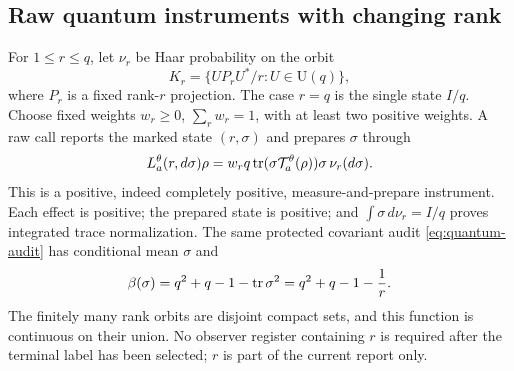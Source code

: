\subsection{Raw quantum instruments with changing rank}
For $1\le r\le q$, let $\nu_r$ be Haar probability on the orbit
\[
 K_r=\{UP_rU^*/r:U\in\mathrm U(q)\},
\]
where $P_r$ is a fixed rank-$r$ projection. The case $r=q$ is the single state $I/q$. Choose fixed weights $w_r\ge0$, $\sum_rw_r=1$, with at least two positive weights. A raw call reports the marked state $(r,\sigma)$ and prepares $\sigma$ through
\begin{equation}\label{eq:rank-instrument}
 L_a^\theta(r,d\sigma)\rho
       =w_rq\operatorname{tr}(\sigma\mathcal T_a^\theta(\rho))\sigma\,\nu_r(d\sigma).
\end{equation}
This is a positive, indeed completely positive, measure-and-prepare instrument. Each effect is positive; the prepared state is positive; and $\int\sigma\,d\nu_r=I/q$ proves integrated trace normalization. The same protected covariant audit \eqref{eq:quantum-audit} has conditional mean $\sigma$ and
\begin{equation}\label{eq:rank-beta}
 \beta(\sigma)=q^2+q-1-\operatorname{tr}\sigma^2
              =q^2+q-1-\frac1r.
\end{equation}
The finitely many rank orbits are disjoint compact sets, and this function is continuous on their union. No observer register containing $r$ is required after the terminal label has been selected; $r$ is part of the current report only.

